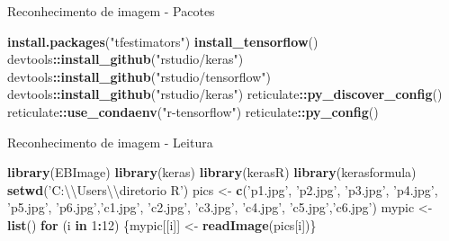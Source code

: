 \documentclass[
  ignorenonframetext,
]{beamer}
\newenvironment{Shaded}{\begin{snugshade}}{\end{snugshade}}
\newcommand{\CharTok}[1]{\textcolor[rgb]{0.31,0.60,0.02}{#1}}
\newcommand{\ControlFlowTok}[1]{\textcolor[rgb]{0.13,0.29,0.53}{\textbf{#1}}}
\newcommand{\DecValTok}[1]{\textcolor[rgb]{0.00,0.00,0.81}{#1}}
\newcommand{\KeywordTok}[1]{\textcolor[rgb]{0.13,0.29,0.53}{\textbf{#1}}}
\newcommand{\NormalTok}[1]{#1}
\newcommand{\OperatorTok}[1]{\textcolor[rgb]{0.81,0.36,0.00}{\textbf{#1}}}
\newcommand{\StringTok}[1]{\textcolor[rgb]{0.31,0.60,0.02}{#1}}
\begin{document}
\begin{frame}[fragile]{Reconhecimento de imagem - Pacotes}
\protect\hypertarget{reconhecimento-de-imagem---pacotes}{}

\begin{Shaded}
\begin{Highlighting}[]
\KeywordTok{install.packages}\NormalTok{(}\StringTok{"tfestimators"}\NormalTok{)}
\KeywordTok{install_tensorflow}\NormalTok{()}
\NormalTok{devtools}\OperatorTok{::}\KeywordTok{install_github}\NormalTok{(}\StringTok{"rstudio/keras"}\NormalTok{)}
\NormalTok{devtools}\OperatorTok{::}\KeywordTok{install_github}\NormalTok{(}\StringTok{"rstudio/tensorflow"}\NormalTok{)}
\NormalTok{devtools}\OperatorTok{::}\KeywordTok{install_github}\NormalTok{(}\StringTok{"rstudio/keras"}\NormalTok{)}
\NormalTok{reticulate}\OperatorTok{::}\KeywordTok{py_discover_config}\NormalTok{()}
\NormalTok{reticulate}\OperatorTok{::}\KeywordTok{use_condaenv}\NormalTok{(}\StringTok{"r-tensorflow"}\NormalTok{)}
\NormalTok{reticulate}\OperatorTok{::}\KeywordTok{py_config}\NormalTok{()}
\end{Highlighting}
\end{Shaded}

\end{frame}

\begin{frame}[fragile]{Reconhecimento de imagem - Leitura}
\protect\hypertarget{reconhecimento-de-imagem---leitura}{}

\begin{Shaded}
\begin{Highlighting}[]
\KeywordTok{library}\NormalTok{(EBImage)}
\KeywordTok{library}\NormalTok{(keras)}
\KeywordTok{library}\NormalTok{(kerasR)}
\KeywordTok{library}\NormalTok{(kerasformula)}
\KeywordTok{setwd}\NormalTok{(}\StringTok{'C:}\CharTok{\textbackslash{}\textbackslash{}}\StringTok{Users}\CharTok{\textbackslash{}\textbackslash{}}\StringTok{diretorio R'}\NormalTok{)}
\NormalTok{pics <-}\StringTok{ }\KeywordTok{c}\NormalTok{(}\StringTok{'p1.jpg'}\NormalTok{, }\StringTok{'p2.jpg'}\NormalTok{, }\StringTok{'p3.jpg'}\NormalTok{, }\StringTok{'p4.jpg'}\NormalTok{, }\StringTok{'p5.jpg'}\NormalTok{,}
          \StringTok{'p6.jpg'}\NormalTok{,}\StringTok{'c1.jpg'}\NormalTok{, }\StringTok{'c2.jpg'}\NormalTok{, }\StringTok{'c3.jpg'}\NormalTok{, }\StringTok{'c4.jpg'}\NormalTok{, }
          \StringTok{'c5.jpg'}\NormalTok{,}\StringTok{'c6.jpg'}\NormalTok{)}
\NormalTok{mypic <-}\StringTok{ }\KeywordTok{list}\NormalTok{()}
\ControlFlowTok{for}\NormalTok{ (i }\ControlFlowTok{in} \DecValTok{1}\OperatorTok{:}\DecValTok{12}\NormalTok{) \{mypic[[i]] <-}\StringTok{ }\KeywordTok{readImage}\NormalTok{(pics[i])\}}
\end{Highlighting}
\end{Shaded}

\end{frame}
\end{document}
